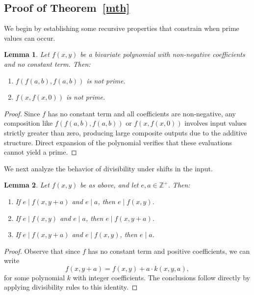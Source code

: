 \documentclass[a4paper,11pt]{article}
\newtheorem{lemma}{Lemma}
\begin{document}
	\subsection{Proof of Theorem~\ref{mth}}
	
	We begin by establishing some recursive properties that constrain when prime values can occur.
	
	\begin{lemma}
		Let $f(x, y)$ be a bivariate polynomial with non-negative coefficients and no constant term. Then:
		\begin{enumerate}
			\item $f(f(a,b), f(a,b))$ is not prime.
			\item $f(x, f(x, 0))$ is not prime.
		\end{enumerate}
	\end{lemma}
	
	\begin{proof}
		Since $f$ has no constant term and all coefficients are non-negative, any composition like $f(f(a,b), f(a,b))$ or $f(x, f(x, 0))$ involves input values strictly greater than zero, producing large composite outputs due to the additive structure. Direct expansion of the polynomial verifies that these evaluations cannot yield a prime.
	\end{proof}
	
	We next analyze the behavior of divisibility under shifts in the input.
	
	\begin{lemma}\label{eqlem}
		Let $f(x, y)$ be as above, and let $e, a \in \mathbb{Z}^+$. Then:
		\begin{enumerate}
			\item If $e \mid f(x, y + a)$ and $e \mid a$, then $e \mid f(x, y)$.
			\item If $e \mid f(x, y)$ and $e \mid a$, then $e \mid f(x, y + a)$.
			\item If $e \mid f(x, y + a)$ and $e \mid f(x, y)$, then $e \mid a$.
		\end{enumerate}
	\end{lemma}
	
	\begin{proof}
		Observe that since $f$ has no constant term and positive coefficients, we can write
		\[
		f(x, y + a) = f(x, y) + a \cdot k(x, y, a),
		\]
		for some polynomial $k$ with integer coefficients. The conclusions follow directly by applying divisibility rules to this identity.
	\end{proof}
	
\end{document}
